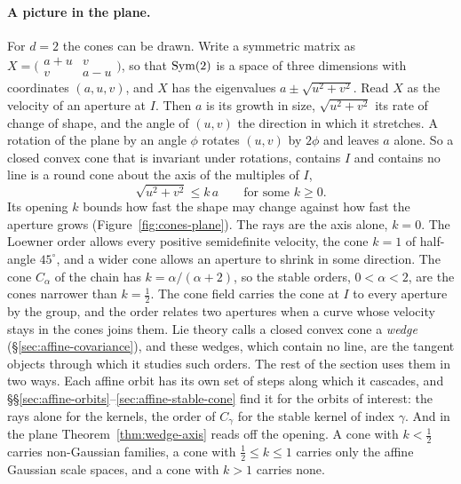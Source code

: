 \paragraph{A picture in the plane.} For $d = 2$ the cones can be drawn. Write a symmetric matrix as
$X = \bigl(\begin{smallmatrix} a+u & v \\ v & a-u \end{smallmatrix}\bigr)$, so that $\mathrm{Sym}(2)$ is a
space of three dimensions with coordinates $(a, u, v)$, and $X$ has the eigenvalues
$a \pm \sqrt{u^2+v^2}$. Read $X$ as the velocity of an aperture at $I$. Then $a$ is its growth in
size, $\sqrt{u^2+v^2}$ its rate of change of shape, and the angle of $(u, v)$ the direction in which
it stretches. A rotation of the plane by an angle $\phi$ rotates $(u, v)$ by $2\phi$ and leaves $a$
alone. So a closed convex cone that is invariant under rotations, contains $I$ and contains no line is
a round cone about the axis of the multiples of $I$,
\[
  \sqrt{u^2+v^2} \le k\,a \qquad \text{for some } k \ge 0 .
\]
Its opening $k$ bounds how fast the shape may change against how fast the aperture grows
(Figure~\ref{fig:cones-plane}). The rays
are the axis alone, $k = 0$. The Loewner order allows every positive semidefinite velocity, the cone
$k = 1$ of half-angle $45^\circ$, and a wider cone allows an aperture to shrink in some direction. The
cone $C_\alpha$ of the chain has $k = \alpha/(\alpha+2)$, so the stable orders, $0 < \alpha < 2$, are
the cones narrower than $k = \frac12$. The cone field carries the cone at $I$ to every aperture by the
group, and the order relates two apertures when a curve whose velocity stays in the cones joins them.
Lie theory calls a closed convex cone a \emph{wedge} (\S\ref{sec:affine-covariance}), and these
wedges, which contain no line, are the tangent objects through which it studies such orders. The rest
of the section uses them in two ways. Each affine orbit has its own set of steps along which it
cascades, and \S\S\ref{sec:affine-orbits}--\ref{sec:affine-stable-cone} find it for the orbits of
interest: the rays alone for the \Matern{} kernels, the order of $C_\gamma$ for the stable kernel of
index $\gamma$. And in the plane
Theorem~\ref{thm:wedge-axis} reads off the opening. A cone with $k < \frac12$ carries non-Gaussian
families, a cone with $\frac12 \le k \le 1$ carries only the affine Gaussian scale spaces, and a cone
with $k > 1$ carries none.

